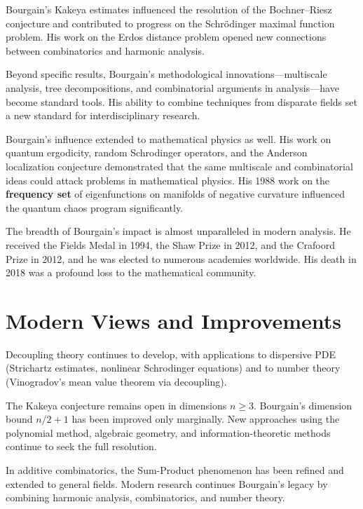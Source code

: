 Bourgain's Kakeya estimates influenced the resolution of the
Bochner--Riesz conjecture and contributed to progress on the
Schr\"{o}dinger maximal function problem.  His work on the Erdos
distance problem opened new connections between combinatorics and
harmonic analysis.

Beyond specific results, Bourgain's methodological
innovations---multiscale analysis, tree decompositions, and
combinatorial arguments in analysis---have become standard tools.
His ability to combine techniques from disparate fields set a new
standard for interdisciplinary research.

Bourgain's influence extended to mathematical physics as well.  His
work on quantum ergodicity, random Schrodinger operators, and the
Anderson localization conjecture demonstrated that the same
multiscale and combinatorial ideas could attack problems in
mathematical physics.  His 1988 work on the \textbf{frequency set}
of eigenfunctions on manifolds of negative curvature influenced the
quantum chaos program significantly.

The breadth of Bourgain's impact is almost unparalleled in modern
analysis.  He received the Fields Medal in 1994, the Shaw Prize in
2012, and the Crafoord Prize in 2012, and he was elected to
numerous academies worldwide.  His death in 2018 was a profound
loss to the mathematical community.

\section{Modern Views and Improvements}

Decoupling theory continues to develop, with applications to
dispersive PDE (Strichartz estimates, nonlinear Schrodinger
equations) and to number theory (Vinogradov's mean value theorem
via decoupling).

The Kakeya conjecture remains open in dimensions $n\geq 3$.
Bourgain's dimension bound $n/2+1$ has been improved only
marginally.  New approaches using the polynomial method, algebraic
geometry, and information-theoretic methods continue to seek the
full resolution.

In additive combinatorics, the Sum-Product phenomenon has been
refined and extended to general fields.  Modern research continues
Bourgain's legacy by combining harmonic analysis, combinatorics,
and number theory.

